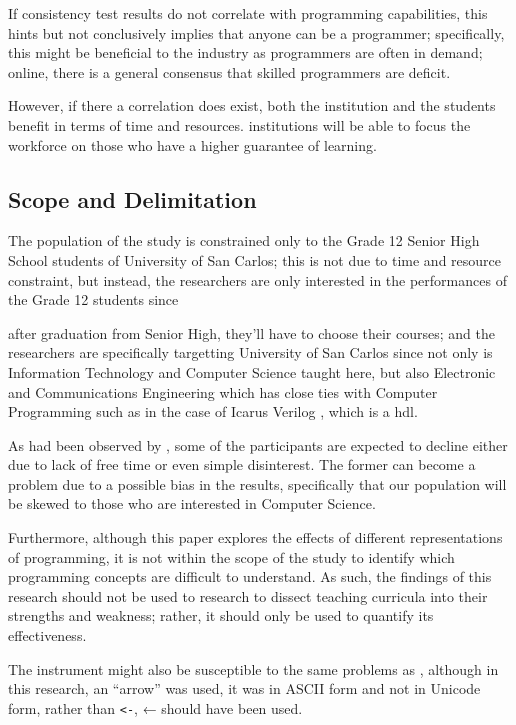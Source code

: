 \documentclass[12pt]{article}
\begin{document}
If consistency test results do not correlate with programming capabilities,
this hints but not conclusively implies that anyone can be a programmer; specifically, 
this might be beneficial to the industry as programmers are often in demand;
online, there is a general consensus that skilled programmers are deficit.

However, if there a correlation does exist, 
both the \gls{institution} and the students benefit in terms of time and resources.
\Glspl{institution} will be able to focus the workforce on those who have a higher guarantee of learning.

\subsection{Scope and Delimitation}
\label{sec:org021fdd1}
The population of the study is constrained only to the Grade 12 Senior High School students of University of San Carlos; 
this is not due to time and resource constraint, but instead, 
the researchers are only interested in the performances of the Grade 12 students since

after graduation from Senior High, they'll have to choose their courses; and
the researchers are specifically targetting University of San Carlos since 
not only is Information Technology and Computer Science taught here,
but also Electronic and Communications Engineering 
which has close ties with Computer Programming
such as in the case of Icarus Verilog \citep{iverilog}, 
which is a \gls{hdl}.

As had been observed by \citep{dehnadi2006camel}, 
some of the participants are expected to
decline either due to lack of free time or even simple disinterest.
The former can become a problem due to a possible bias in the results,
specifically that our population will be skewed to those who are
interested in Computer Science.

Furthermore, although this paper explores the effects of different representations of programming, 
it is not within the scope of the study to identify which programming concepts are difficult to understand. 
As such, the findings of this research should not be used to research to 
dissect teaching curricula into their strengths and weakness; rather, 
it should only be used to quantify its effectiveness.

The instrument might also be susceptible to the same problems as \cite{dehnadi2006camel},
although in this research, an ``arrow'' was used, 
it was in ASCII form and not in Unicode form,
rather than \texttt{<-}, ← should have been used.
\end{document}

